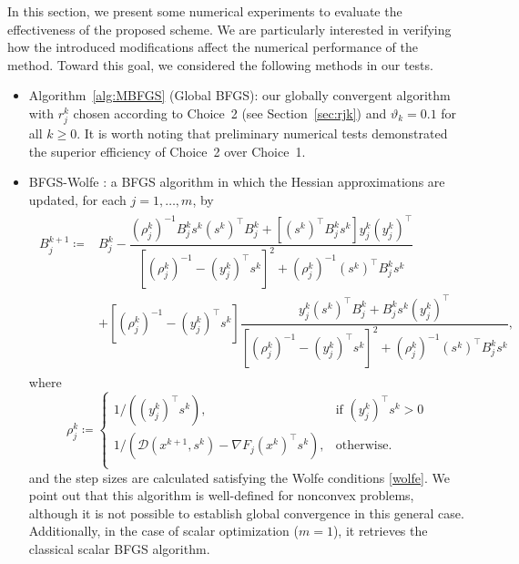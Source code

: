 \documentclass[11pt]{article}
\numberwithin{assumption}{section}
\newcommand{\D}{\mathcal{D}}
\begin{document}
In this section, we present some numerical experiments to evaluate the effectiveness of the proposed scheme.
We are particularly interested in verifying how the introduced modifications affect the numerical performance of the method.
Toward this goal, we considered the following methods in our tests.
\begin{itemize}

\item Algorithm~\ref{alg:MBFGS} (Global BFGS): our globally convergent algorithm with $r_j^k$ chosen according to Choice~2 (see Section~\ref{sec:rjk}) and $\vartheta_k=0.1$ for all $k\geq 0$. It is worth noting that preliminary numerical tests demonstrated the superior efficiency of Choice~2 over Choice~1.

\item BFGS-Wolfe \cite{Leandro&Danilo}:  a BFGS algorithm  in which the Hessian approximations are updated, for each $j=1,\ldots,m$, by
\begin{align*}
\begin{split}
B_j^{k+1} \coloneqq &  B_j^{k} - \dfrac{(\rho_j^k)^{-1}B_j^{k}s^k(s^k)^\top B_j^{k}+[(s^k)^\top B_j^{k}s^k] y_j^{k}			(y_j^{k})^\top }{\left[(\rho_j^k)^{-1}-(y_j^{k})^\top s^k\right]^2 + (\rho_j^k)^{-1}(s^k)^\top B_j^ks^k}  \\
			& + \left[(\rho_j^k)^{-1} - (y_j^{k})^\top s^k\right]\dfrac{y_j^{k}(s^k)^\top B_j^{k} + B_j^{k}s^k(y_j^{k})^\top }{\left[(\rho_j^k)^{-1}-(y_j^{k})^\top s^k\right]^2 + (\rho_j^k)^{-1}(s^k)^\top B_j^ks^k}, 
			\end{split}
		\end{align*}
		where 	
\begin{equation*}\label{rho}
		\rho_j^k \coloneqq \left\{\begin{array}{ll}
		1/\left( (y_j^{k})^\top s^k\right), & \mbox{if } (y_j^{k})^\top s^k > 0\\
		1/\left(\D(x^{k+1},s^k)-\nabla F_j(x^k)^\top s^k\right), & \mbox{otherwise}.\\
		\end{array}\right.
		\end{equation*} 
and the step sizes are calculated satisfying the Wolfe conditions \eqref{wolfe}.
We point out that this algorithm is well-defined for nonconvex problems, although it is not possible to establish global convergence in this general case. Additionally, in the case of scalar optimization ($m = 1$), it retrieves the classical scalar BFGS algorithm.




\end{itemize}
\end{document}
